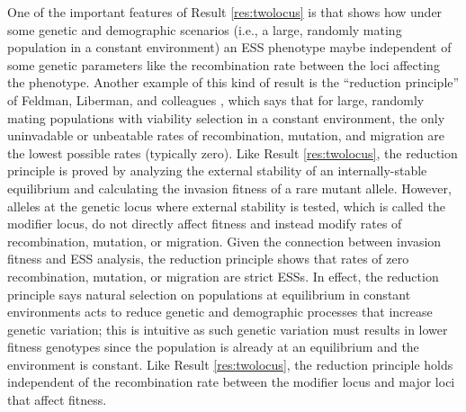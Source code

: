 \documentclass[11pt]{article}
\begin{document}
\begin{figure}[t!]
  \label{fig:pip:switching}
\end{figure}

One of the important features of Result \ref{res:twolocus} is that shows how under some genetic and demographic scenarios (i.e., a large, randomly mating population in a constant environment) an ESS phenotype maybe independent of some genetic parameters like the recombination rate between the loci affecting the phenotype. Another example of this kind of result is the ``reduction principle'' of Feldman, Liberman, and colleagues \cite{Feldman:Liberman:1986,Liberman:Feldman:1986,Liberman:Feldman:1986a,Liberman:Feldman:1989,Altenberg:Liberman:2017}, which says that for large, randomly mating populations with viability selection in a constant environment, the only uninvadable or unbeatable rates of recombination, mutation, and migration are the lowest possible rates (typically zero). Like Result \ref{res:twolocus}, the reduction principle is proved by analyzing the external stability of an internally-stable equilibrium and calculating the invasion fitness of a rare mutant allele. However, alleles at the genetic locus where external stability is tested, which is called the modifier locus, do not directly affect fitness and instead modify rates of recombination, mutation, or migration. Given the connection between invasion fitness and ESS analysis, the reduction principle shows that rates of zero recombination, mutation, or migration are strict ESSs. In effect, the reduction principle says natural selection on populations at equilibrium in constant environments acts to reduce genetic and demographic processes that increase genetic variation; this is intuitive as such genetic variation must results in lower fitness genotypes since the population is already at an equilibrium and the environment is constant. Like Result \ref{res:twolocus}, the reduction principle holds independent of the recombination rate between the modifier locus and major loci that affect fitness.
\end{document}
